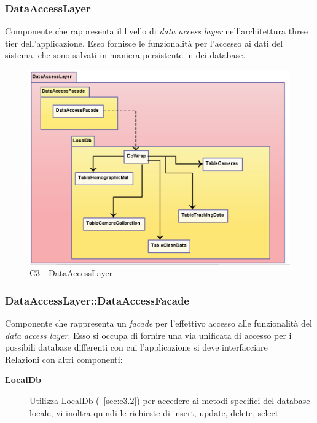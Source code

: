 \subsubsection{DataAccessLayer} \label{sec:c3}
Componente che rappresenta il livello di \textit{data access layer} nell'architettura three tier dell'applicazione. Esso fornisce le funzionalità per l'accesso ai dati del sistema, che sono salvati in maniera persistente in dei database. 
\\
\begin{figure}[!h] 

        \centering 

        \includegraphics[scale=0.4]{./images/c3.png} 

        \caption{C3 - DataAccessLayer} 

        \label{fig:c3}

        \end{figure} 

\subsubsection{DataAccessLayer::DataAccessFacade} \label{sec:c3.1}
Componente che rappresenta un \textit{facade} per l'effettivo accesso alle funzionalità del \textit{data access layer}. Esso si occupa di fornire una via unificata di accesso per i possibili database differenti con cui l'applicazione si deve interfacciare\\
Relazioni con altri componenti: 
\begin{description} 
\item [\textbf{LocalDb}]
Utilizza LocalDb (~\ref{sec:c3.2}) per accedere ai metodi specifici del database locale, vi inoltra quindi le richieste di insert, update, delete, select 
\end{description} 


